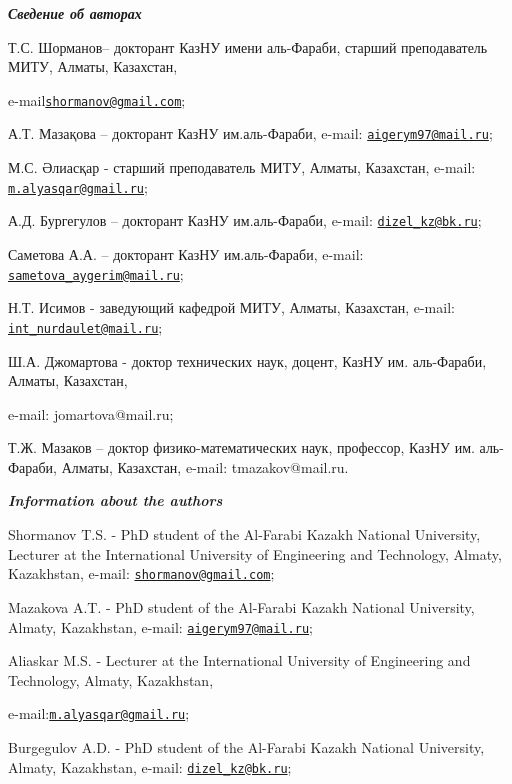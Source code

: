 \begin{authorinfo}
\hspace{1em}\emph{{\bfseries Сведение об авторах}}

Т.С. Шорманов-- докторант КазНУ имени аль-Фараби, старший преподаватель
МИТУ, Алматы, Казахстан,

e-mail\href{mailto:shormanov@gmail.com}{\nolinkurl{shormanov@gmail.com}};

А.Т. Мазақова -- докторант КазНУ им.аль-Фараби, e-mail:
\href{mailto:aigerym97@mail.ru}{\nolinkurl{aigerym97@mail.ru}};

М.С. Әлиасқар - старший преподаватель МИТУ, Алматы, Казахстан, e-mail:
\href{mailto:m.alyasqar@gmail.ru}{\nolinkurl{m.alyasqar@gmail.ru}};

А.Д. Бургегулов -- докторант КазНУ им.аль-Фараби, e-mail:
\href{mailto:dizel_kz@bk.ru}{\nolinkurl{dizel\_kz@bk.ru}};

Саметова А.А. -- докторант КазНУ им.аль-Фараби, e-mail:
\href{mailto:sametova_aygerim@mail.ru}{\nolinkurl{sametova\_aygerim@mail.ru}};

Н.Т. Исимов - заведующий кафедрой МИТУ, Алматы, Казахстан, e-mail:
\href{mailto:int_nurdaulet@mail.ru}{\nolinkurl{int\_nurdaulet@mail.ru}};

Ш.А. Джомартова - доктор технических наук, доцент, КазНУ им. аль-Фараби,
Алматы, Казахстан,

e-mail: jomartova@mail.ru;

Т.Ж. Мазаков -- доктор физико-математических наук, профессор, КазНУ им.
аль-Фараби, Алматы, Казахстан, e-mail: tmazakov@mail.ru.

\hspace{1em}\emph{{\bfseries Information about the authors}}

Shormanov T.S. - PhD student of the Al-Farabi Kazakh National
University, Lecturer at the International University of Engineering and
Technology, Almaty, Kazakhstan, e-mail:
\href{mailto:shormanov@gmail.com}{\nolinkurl{shormanov@gmail.com}};

Mazakova A.T. - PhD student of the Al-Farabi Kazakh National University,
Almaty, Kazakhstan, e-mail:
\href{mailto:aigerym97@mail.ru}{\nolinkurl{aigerym97@mail.ru}};

Aliaskar M.S. - Lecturer at the International University of Engineering
and Technology, Almaty, Kazakhstan, 

e-mail:\href{mailto:m.alyasqar@gmail.ru}{\nolinkurl{m.alyasqar@gmail.ru}};

Burgegulov A.D. - PhD student of the Al-Farabi Kazakh National
University, Almaty, Kazakhstan, e-mail:
\href{mailto:dizel_kz@bk.ru}{\nolinkurl{dizel\_kz@bk.ru}};


\end{authorinfo}
